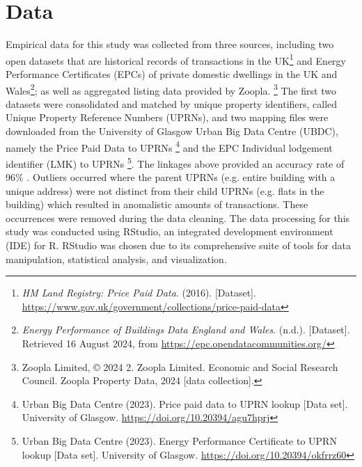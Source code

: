 \section{Data}
Empirical data for this study was collected from three sources, including two open datasets that are historical records of transactions in the UK\footnote{\textit{HM Land Registry: Price Paid Data}. (2016). [Dataset]. \href{https://www.gov.uk/government/collections/price-paid-data}{https://www.gov.uk/government/collections/price-paid-data}} and Energy Performance Certificates (EPCs) of private domestic dwellings in the UK and Wales\footnote{\textit{Energy Performance of Buildings Data England and Wales}. (n.d.). [Dataset]. Retrieved 16 August 2024, from \href{https://epc.opendatacommunities.org/}{https://epc.opendatacommunities.org/}}; as well as aggregated listing data provided by Zoopla. \footnote{Zoopla Limited, © 2024 2. Zoopla Limited. Economic and Social Research Council. Zoopla Property Data, 2024 [data collection].}
The first two datasets were consolidated and matched by unique property identifiers, called Unique Property Reference Numbers (UPRNs), and two mapping files were downloaded from the University of Glasgow Urban Big Data Centre (UBDC), namely the Price Paid Data to UPRNs \footnote{Urban Big Data Centre (2023). Price paid data to UPRN lookup [Data set]. University of Glasgow. \url{https://doi.org/10.20394/agu7hprj}} and the EPC Individual lodgement identifier (LMK) to UPRNs \footnote{Urban Big Data Centre (2023). Energy Performance Certificate to UPRN lookup [Data set]. University of Glasgow. \url{https://doi.org/10.20394/okfrrz60}}. The linkages above provided an accuracy rate of 96\% \cite{urban_big_data_centre_price_2023}. Outliers occurred where the parent UPRNs (e.g. entire building with a unique address) were not distinct from their child UPRNs (e.g. flats in the building) which resulted in anomalistic amounts of transactions. These occurrences were removed during the data cleaning. The data processing for this study was conducted using RStudio, an integrated development environment (IDE) for R. RStudio was chosen due to its comprehensive suite of tools for data manipulation, statistical analysis, and visualization.

